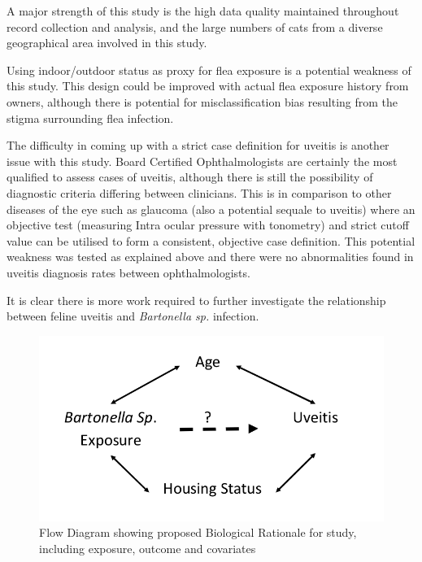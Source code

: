 \documentclass[11pt,twocolumn]{article}
\begin{document}
		A major strength of this study is the high data quality maintained throughout record collection and analysis, and the large numbers of cats from a diverse geographical area involved in this study.


		Using indoor/outdoor status as proxy for flea exposure is a potential weakness of this study. 
		This design could be improved with actual flea exposure history from owners, although there is potential for misclassification bias resulting from the stigma surrounding flea infection.
		
		
		The difficulty in coming up with a strict case definition for uveitis is another issue with this study. 
		Board Certified Ophthalmologists are certainly the most qualified to assess cases of uveitis, although there is still the possibility of diagnostic criteria differing between clinicians. 
		This is in comparison to other diseases of the eye such as glaucoma (also a potential sequale to uveitis) where an objective test (measuring Intra ocular pressure with tonometry) and strict cutoff value can be utilised to form a consistent, objective case definition.
		This potential weakness was tested as explained above and there were no abnormalities found in uveitis diagnosis rates between ophthalmologists.


		It is clear there is more work required to further investigate the relationship between feline uveitis and \emph{Bartonella sp.} infection.
\newpage
\begin{figure}[h!]
	\centering
	\includegraphics[scale=0.4]{figure1.jpg}
	\caption{Flow Diagram showing proposed Biological Rationale for study, including exposure, outcome and covariates }
	\label{fig:1}
\end{figure}
\end{document}
